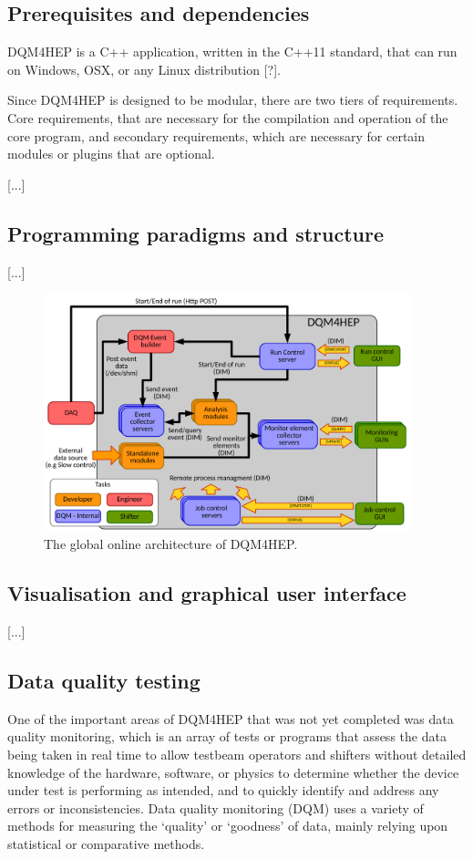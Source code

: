 \subsection{Prerequisites and dependencies}

DQM4HEP is a C++ application, written in the C++11 standard, that can run on Windows, OSX, or any Linux distribution [?]. 

Since DQM4HEP is designed to be modular, there are two tiers of requirements. Core requirements, that are necessary for the compilation and operation of the core program, and secondary requirements, which are necessary for certain modules or plugins that are optional.

[...]

\subsection{Programming paradigms and structure}
[...]

\begin{figure}[h]
	\centering
	\includegraphics[width=0.95\textwidth]{../Pictures/GlobalArchitectureDiagram.pdf}
	\caption{The global online architecture of DQM4HEP.}
	\label{figure:daq/dqm4hep/architecture}
\end{figure}

\subsection{Visualisation and graphical user interface}
[...]

\subsection{Data quality testing}
One of the important areas of DQM4HEP that was not yet completed was data quality monitoring, which is an array of tests or programs that assess the data being taken in real time to allow testbeam operators and shifters without detailed knowledge of the hardware, software, or physics to determine whether the device under test is performing as intended, and to quickly identify and address any errors or inconsistencies. Data quality monitoring (DQM) uses a variety of methods for measuring the `quality' or `goodness' of data, mainly relying upon statistical or comparative methods.

